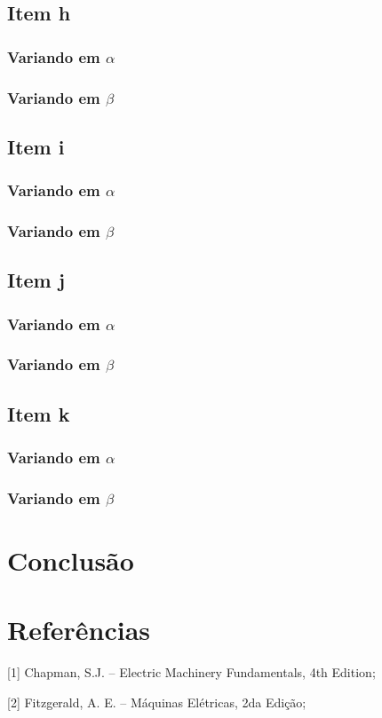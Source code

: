 \documentclass[a4paper, 12pt]{article}
\begin{document}
		\subsection{Item h}		
			\subsubsection{Variando em $\alpha$}
			\subsubsection{Variando em $\beta$}	
		\subsection{Item i}			
			\subsubsection{Variando em $\alpha$}
			\subsubsection{Variando em $\beta$}
		\subsection{Item j}		
			\subsubsection{Variando em $\alpha$}
			\subsubsection{Variando em $\beta$}	
		\subsection{Item k}	
			\subsubsection{Variando em $\alpha$}
			\subsubsection{Variando em $\beta$}	
	\section{Conclusão}
		
	\newpage
	\section{Referências}
	
	[1] Chapman, S.J. -- Electric Machinery Fundamentals, 4th Edition;
	
	[2] Fitzgerald, A. E. -- Máquinas Elétricas, 2da Edição;
	
\end{document}
